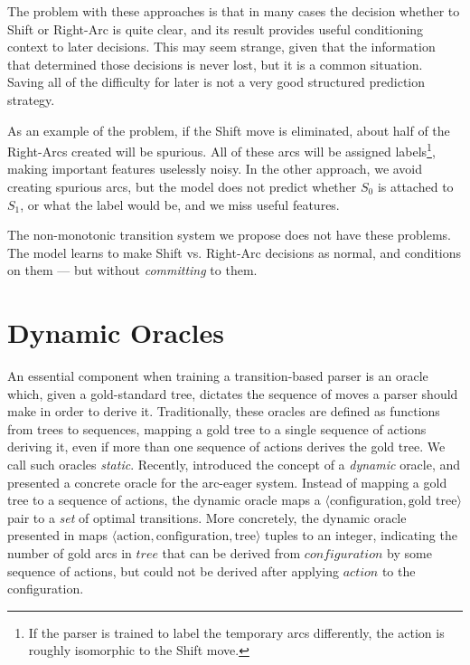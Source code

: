 \documentclass[11pt,letterpaper]{article}
\newcommand{\tuple}[1]{$\langle#1\rangle$}
\newcommand{\maybe}[1]{\textcolor{gray}{#1}}
\begin{document}
The problem with these approaches is that in many cases the decision whether
to Shift or Right-Arc is quite clear, and its result provides useful
conditioning context to later decisions.
This may seem strange, given that the information that determined those decisions
is never lost, but it is a common situation.
Saving all of the difficulty for later
is not a very good structured prediction strategy. 

As an example of the problem, if the Shift move is
eliminated, about half of the Right-Arcs created will be spurious. All of these
arcs will be assigned labels\footnote{If the parser is trained to label the temporary
arcs differently, the action is roughly isomorphic to the Shift move.},
making important features uselessly noisy. In the other approach, we avoid creating
spurious arcs, but the model does not predict whether $S_0$ is attached to $S_1$,
or what the label would be, and we miss useful features.


The non-monotonic transition system we propose does not have these problems.
The model learns to make Shift vs. Right-Arc decisions as normal, and conditions on them --- but
without \emph{committing} to them.

\section{Dynamic Oracles}
\label{ref:oracle}

 An essential component when training a transition-based parser is an oracle
 which, given a gold-standard tree, dictates the sequence of moves a parser
 should make in order to derive it.  Traditionally, these oracles are defined
 as functions from trees to sequences, mapping a gold tree to a single sequence
 of actions deriving it, even if more than one sequence of actions derives the
 gold tree. We call such oracles \emph{static}.  Recently, 
 \citet{goldberg:12} introduced the concept of a \emph{dynamic} oracle, and
 presented a concrete oracle for the arc-eager system.  Instead of mapping a
 gold tree to a sequence of actions, the dynamic oracle maps a
 \tuple{\text{configuration}, \text{gold tree}} pair to a \emph{set} of optimal transitions.
 More concretely, the dynamic
    oracle presented in \cite{goldberg:12} maps
\tuple{\text{action},\text{configuration},\text{tree}}
    tuples to an integer, indicating the number of gold arcs in $tree$
that can be
    derived from $configuration$ by some sequence of actions, but
could not be derived
    after applying $action$ to the configuration.
\end{document}

